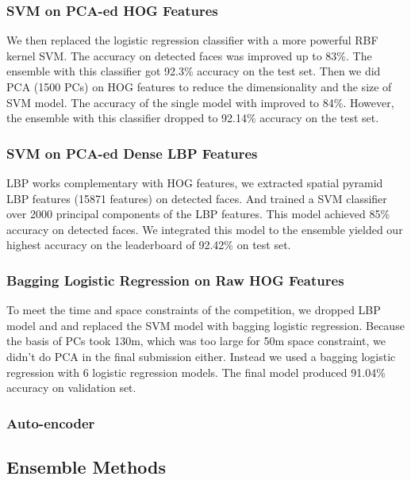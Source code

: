 \subsubsection{SVM on PCA-ed HOG Features}
We then replaced the logistic regression classifier with a more powerful RBF kernel SVM. The accuracy on detected faces was improved up to 83\%. The ensemble with this classifier got 92.3\% accuracy on the test set.  Then we did PCA (1500 PCs) on HOG features to reduce the dimensionality and the size of SVM model. The accuracy of the single model with improved to 84\%. However, the ensemble with this classifier dropped to 92.14\% accuracy on the test set. 
\subsubsection{SVM on PCA-ed Dense LBP Features}
LBP works complementary with HOG features, we extracted spatial pyramid LBP features (15871 features) on detected faces. And trained a SVM classifier over 2000 principal components of the LBP features. This model achieved 85\% accuracy on detected faces. We integrated this model to the ensemble yielded our highest accuracy on the leaderboard of 92.42\% on test set.
\subsubsection{Bagging Logistic Regression on Raw HOG Features}
To meet the time and space constraints of the competition, we dropped LBP model and and replaced the SVM model with bagging logistic regression. Because the basis of PCs took 130m, which was too large for 50m space constraint, we didn't do PCA in the final submission either. Instead we used a bagging logistic regression with 6 logistic regression  models. The final model produced 91.04\% accuracy on validation set.
\subsubsection{Auto-encoder}
\subsection{Ensemble Methods}
